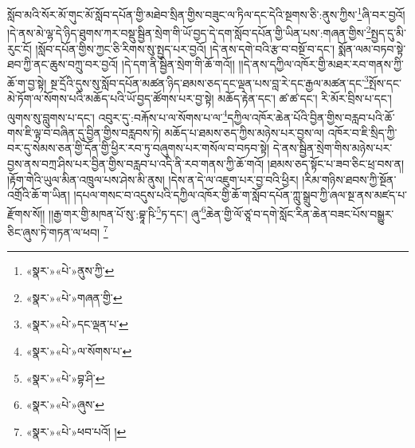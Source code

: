 སློབ་མའི་སོར་མོ་གུང་མོ་སློབ་དཔོན་གྱི་མཐེབ་སྲིན་གྱིས་བཟུང་ལ་ཏིལ་དང་དེའི་སྔགས་ཅི་:ནུས་ཀྱིས་\footnote{«སྣར་»«པེ་»ནུས་ཀྱི་}ཞི་བར་བྱའོ། །དེ་ནས་མེ་ལྷ་དེ་ཉིད་ཐུགས་ཀར་བསྡུ་སྦྱིན་སྲེག་གི་ཡོ་བྱད་དེ་དག་སློབ་དཔོན་གྱི་ཡིན་པས་:གཞན་གྱིས་\footnote{«སྣར་»«པེ་»གཞན་གྱི་}སྤྱད་དུ་མི་རུང་ངོ། །སློབ་དཔོན་གྱིས་ཀྱང་ཅི་རིགས་སུ་སྤྱད་པར་བྱའོ། །དེ་ནས་དགེ་བའི་རྩ་བ་བསྔོ་བ་དང་། སྨོན་ལམ་བཏབ་སྟེ་ཐབ་ཀྱི་ནང་ཆུས་བཀྲུ་བར་བྱའོ། །དེ་དག་ནི་སྦྱིན་སྲེག་གི་ཆོ་གའོ།། །།དེ་ནས་དཀྱིལ་འཁོར་གྱི་མཐར་རབ་གནས་ཀྱི་ཆོ་ག་བྱ་སྟེ། སྔ་དྲོའི་དུས་སུ་སློབ་དཔོན་མཚན་ཉིད་ཐམས་ཅད་དང་ལྡན་པས་བླ་རེ་དང་རྒྱལ་མཚན་དང་\footnote{«སྣར་»«པེ་»དང་ལྡན་པ་}སྤོས་དང་མེ་ཏོག་ལ་སོགས་པའི་མཆོད་པའི་ཡོ་བྱད་ཚོགས་པར་བྱ་སྟེ། མཆོད་རྟེན་དང་། ཚ་ཚ་དང་། རི་མོར་བྲིས་པ་དང་། ལུགས་སུ་བླུགས་པ་དང་། འབུར་དུ་:བརྐོས་པ་ལ་སོགས་པ་ལ་\footnote{«སྣར་»«པེ་»ལ་སོགས་པ་}དཀྱིལ་འཁོར་ཆེན་པོའི་བྱིན་གྱིས་བརླབ་པའི་ཆོ་གས་ཇི་ལྟ་བ་བཞིན་དུ་བྱིན་གྱིས་བརླབས་ཏེ། མཆོད་པ་ཐམས་ཅད་ཀྱིས་མཉེས་པར་བྱས་ལ། འཁོར་བ་ཇི་སྲིད་ཀྱི་བར་དུ་སེམས་ཅན་གྱི་དོན་གྱི་ཕྱིར་རབ་ཏུ་བཞུགས་པར་གསོལ་བ་བཏབ་སྟེ། དེ་ནས་སྦྱིན་སྲེག་གིས་མཉེས་པར་བྱས་ནས་བཀྲ་ཤིས་པར་བྱིན་གྱིས་བརླབ་པ་འདི་ནི་རབ་གནས་ཀྱི་ཆོ་གའོ། །ཐམས་ཅད་སྟོང་པ་ཟབ་ཅིང་ཕྲ་བས་ན། །རྟོག་གེའི་ཡུལ་མིན་འཁྲུལ་པས་ཤེས་མི་ནུས། །དེས་ན་དེ་ལ་འཇུག་པར་བྱ་བའི་ཕྱིར། །རིམ་གཉིས་ཐབས་ཀྱི་སྔོན་འགྲོའི་ཆོ་ག་ཡིན། །དཔལ་གསང་བ་འདུས་པའི་དཀྱིལ་འཁོར་གྱི་ཆོ་ག་སློབ་དཔོན་ཀླུ་སྒྲུབ་ཀྱི་ཞལ་སྔ་ནས་མཛད་པ་རྫོགས་སོ།། །།རྒྱ་གར་གྱི་མཁན་པོ་སུ་:བྷཱ་ཥི་\footnote{«སྣར་»«པེ་»བྷ་ཤི་}ཏ་དང་། ཞུ་\footnote{«སྣར་»«པེ་»ཞུས་}ཆེན་གྱི་ལོ་ཙཱ་བ་དགེ་སློང་རིན་ཆེན་བཟང་པོས་བསྒྱུར་ཅིང་ཞུས་ཏེ་གཏན་ལ་ཕབ། \footnote{«སྣར་»«པེ་»ཕབ་པའོ། ། }